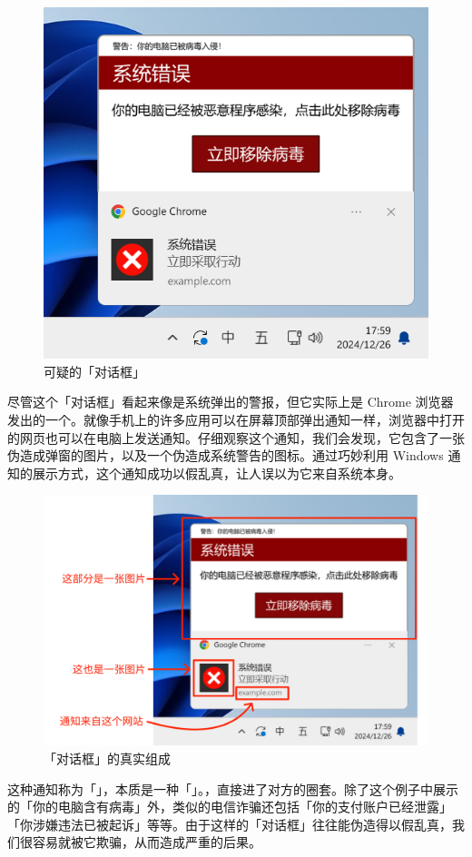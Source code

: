 \begin{figure}[htb!]
  \centering
  \includegraphics[width=.5\textwidth]{assets/basic/Fake_anti_virus_notification.png}
  \caption{可疑的「对话框」}
  \label{fig:Fake_anti_virus_notification}
\end{figure}

尽管这个「对话框」看起来像是系统弹出的警报，但它实际上是 Chrome 浏览器发出的一个。就像手机上的许多应用可以在屏幕顶部弹出通知一样，浏览器中打开的网页也可以在电脑上发送通知。仔细观察这个通知，我们会发现，它包含了一张伪造成弹窗的图片，以及一个伪造成系统警告的图标。通过巧妙利用 Windows 通知的展示方式，这个通知成功以假乱真，让人误以为它来自系统本身。

\begin{figure}[htb!]
  \centering
  \includegraphics[width=.7\textwidth]{assets/basic/Fake_notification_components.png}
  \caption{「对话框」的真实组成}
  \label{fig:Fake_notification_components}
\end{figure}

这种通知称为「」，本质是一种「」。，直接进了对方的圈套。除了这个例子中展示的「你的电脑含有病毒」外，类似的电信诈骗还包括「你的支付账户已经泄露」「你涉嫌违法已被起诉」等等。由于这样的「对话框」往往能伪造得以假乱真，我们很容易就被它欺骗，从而造成严重的后果。

